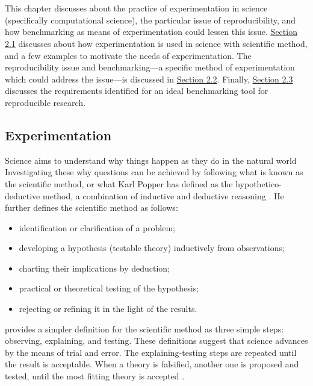 \chapter{\chExperimentation}
\label{ch:experimentation}

This chapter discusses about the practice of experimentation in science (specifically computational science), the particular issue of reproducibility, and how benchmarking as means of experimentation could lessen this issue.
\hyperref[sec:experimentation]{Section 2.1} discusses about how experimentation is used in science with scientific method, and a few examples to motivate the needs of experimentation.
The reproducibility issue and benchmarking---a specific method of experimentation which could address the issue---is discussed in \hyperref[sec:reproducibleBenchmarks]{Section 2.2}.
Finally, \hyperref[sec:idealBenchmarkingTool]{Section 2.3} discusses the requirements identified for an ideal benchmarking tool for reproducible research.

\section{Experimentation}
\label{sec:experimentation}

Science aims to understand why things happen as they do in the natural world \citep{careyBeginnerGuideScientific2012}
Investigating these why questions can be achieved by following what is known as the scientific method, or what Karl Popper has defined as the hypothetico-deductive method, a combination of inductive and deductive reasoning \citep{wallimanResearchMethodsBasics2010a}.
He further defines the scientific method as follows:
\begin{itemize}[noitemsep]
	\item identification or clarification of a problem;
	\item developing a hypothesis (testable theory) inductively from observations;
	\item charting their implications by deduction;
	\item practical or theoretical testing of the hypothesis;
	\item rejecting or refining it in the light of the results.
\end{itemize}

\citet{careyBeginnerGuideScientific2012} provides a simpler definition for the scientific method as three simple steps: observing, explaining, and testing.
These definitions suggest that science advances by the means of trial and error.
The explaining-testing steps are repeated until the result is acceptable.
When a theory is falsified, another one is proposed and tested, until the most fitting theory is accepted \citep{wallimanResearchMethodsBasics2010a}.

